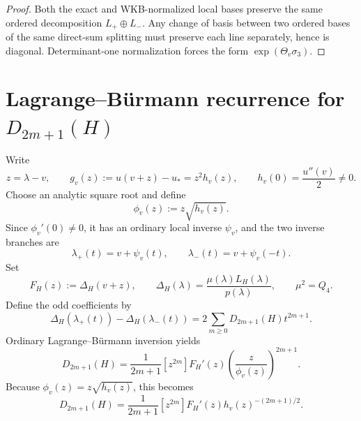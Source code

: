 \documentclass[11pt]{article}
\newcommand{\Qfour}{Q_4}
\newcommand{\LH}{L_H}
\begin{document}
\begin{proof}
Both the exact and WKB-normalized local bases preserve the same ordered decomposition $L_+\oplus L_-$. Any change of basis between two ordered bases of the same direct-sum splitting must preserve each line separately, hence is diagonal. Determinant-one normalization forces the form $\exp(\Theta_v\sigma_3)$.
\end{proof}

\section{Lagrange--B\"urmann recurrence for $D_{2m+1}(H)$}
Write
\begin{equation}
 z=\lambda-v,\qquad g_v(z):=u(v+z)-u_*=z^2h_v(z),\qquad h_v(0)=\frac{u''(v)}{2}\neq 0.
\end{equation}
Choose an analytic square root and define
\begin{equation}
 \phi_v(z):=z\sqrt{h_v(z)}.
\end{equation}
Since $\phi_v'(0)\neq 0$, it has an ordinary local inverse $\psi_v$, and the two inverse branches are
\begin{equation}
 \lambda_+(t)=v+\psi_v(t),\qquad \lambda_-(t)=v+\psi_v(-t).
\end{equation}
Set
\begin{equation}
 F_H(z):=\Delta_H(v+z),\qquad \Delta_H(\lambda)=\frac{\mu(\lambda)\LH(\lambda)}{p(\lambda)},\qquad \mu^2=\Qfour.
\end{equation}
Define the odd coefficients by
\begin{equation}
 \Delta_H(\lambda_+(t))-\Delta_H(\lambda_-(t))=2\sum_{m\ge0}D_{2m+1}(H)t^{2m+1}.
\end{equation}
Ordinary Lagrange--B\"urmann inversion yields
\begin{equation}
 D_{2m+1}(H)=\frac{1}{2m+1}[z^{2m}]F_H'(z)\left(\frac{z}{\phi_v(z)}\right)^{2m+1}.
\end{equation}
Because $\phi_v(z)=z\sqrt{h_v(z)}$, this becomes
\begin{equation}
 D_{2m+1}(H)=\frac{1}{2m+1}[z^{2m}]F_H'(z)h_v(z)^{-(2m+1)/2}.
 \label{eq:kernel-supp}
\end{equation}
\end{document}
